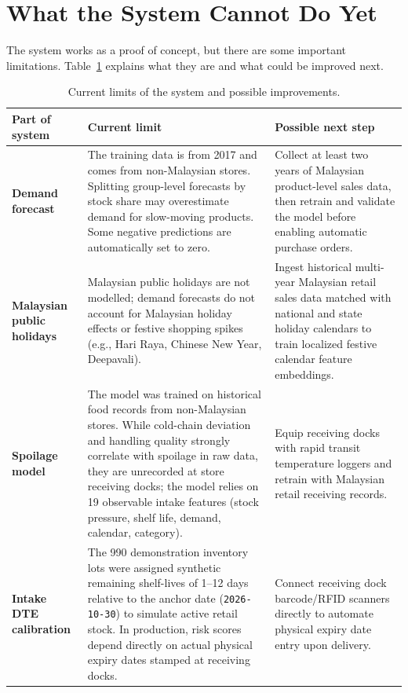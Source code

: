 \documentclass[12pt,a4paper]{article}
\renewcommand{\_}{\oldunderscore\allowbreak}
\begin{document}
\section{What the System Cannot Do Yet}

The system works as a proof of concept, but there are some important limitations. Table~\ref{tab:limitations} explains what they are and what could be improved next.

\begin{table}[H]
\centering
\caption{Current limits of the system and possible improvements.}
\label{tab:limitations}
\renewcommand{\arraystretch}{1.15}
{\scriptsize
\begin{tabularx}{\textwidth}{@{} >{\bfseries}l >{\raggedright\arraybackslash}X >{\raggedright\arraybackslash}X @{}}
\toprule
\rowcolor{NavyPrimary}
\color{white}\textbf{Part of system} & \color{white}\textbf{Current limit} & \color{white}\textbf{Possible next step} \\
\midrule
Demand forecast & The training data is from 2017 and comes from non-Malaysian stores. Splitting group-level forecasts by stock share may overestimate demand for slow-moving products. Some negative predictions are automatically set to zero. & Collect at least two years of Malaysian product-level sales data, then retrain and validate the model before enabling automatic purchase orders. \\
\rowcolor{LightBg}
Malaysian public holidays & Malaysian public holidays are not modelled; demand forecasts do not account for Malaysian holiday effects or festive shopping spikes (e.g., Hari Raya, Chinese New Year, Deepavali). & Ingest historical multi-year Malaysian retail sales data matched with national and state holiday calendars to train localized festive calendar feature embeddings. \\
Spoilage model & The model was trained on historical food records from non-Malaysian stores. While cold-chain deviation and handling quality strongly correlate with spoilage in raw data, they are unrecorded at store receiving docks; the model relies on 19 observable intake features (stock pressure, shelf life, demand, calendar, category). & Equip receiving docks with rapid transit temperature loggers and retrain with Malaysian retail receiving records. \\
\rowcolor{LightBg}
Intake DTE calibration & The 990 demonstration inventory lots were assigned synthetic remaining shelf-lives of 1--12 days relative to the anchor date (\texttt{2026-10-30}) to simulate active retail stock. In production, risk scores depend directly on actual physical expiry dates stamped at receiving docks. & Connect receiving dock barcode/RFID scanners directly to automate physical expiry date entry upon delivery. \\

\end{tabularx}}
\end{table}
\end{document}
